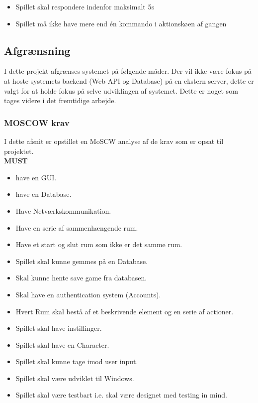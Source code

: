 \begin{itemize}
\item Spillet skal respondere indenfor maksimalt 5s
\item Spillet må ikke have mere end én kommando i aktionskøen af gangen
\end{itemize}

    

\subsection{Afgrænsning}
I dette projekt afgrænses systemet på følgende måder. Der vil ikke være fokus på at hoste systemets backend (Web API og Database) på en ekstern server, dette er valgt for at holde fokus på selve udviklingen af systemet. Dette er noget som tages videre i det fremtidige arbejde.  

\subsubsection{MOSCOW krav}
\label{sssec:MOSCOW}
I dette afsnit er opstillet en MoSCW analyse af de krav som er opsat til projektet.\\

\textbf{MUST}
\begin{itemize}

\item have en GUI.
\item have en Database.
\item Have Netværkskommunikation.
\item Have en serie af sammenhængende rum.
\item Have et start og slut rum som ikke er det samme rum.
\item Spillet skal kunne gemmes på en Database.
\item Skal kunne hente save game fra databasen.
\item Skal have en authentication system (Accounts).
\item Hvert Rum skal bestå af et beskrivende element og en serie af actioner.
\item Spillet skal have instillinger.
\item Spillet skal have en Character.
\item Spillet skal kunne tage imod user input.
\item Spillet skal være udviklet til Windows.
\item Spillet skal være testbart i.e. skal være designet med testing in mind.

\end{itemize}



